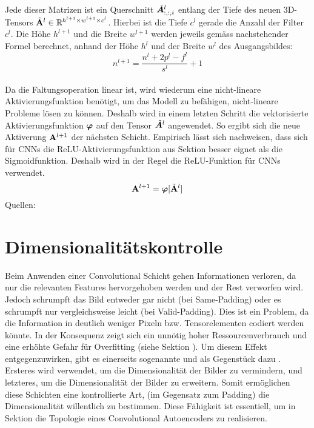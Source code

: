 \\
Jede dieser Matrizen ist ein Querschnitt $\tilde{\bm{A}}^l_{:,:,i}$ entlang der
Tiefe des neuen 3D-Tensors $\tilde{\mathbf{A}}^l \in \mathbb{R}^{h^{l+1} \times w^{l+1} \times c^l}$.
Hierbei ist die Tiefe $c^l$ gerade die Anzahl der Filter $c^l$. Die Höhe
$h^{l+1}$ und die Breite $w^{l+1}$ werden jeweils gemäss nachstehender Formel berechnet,
anhand der Höhe $h^l$ und der Breite $w^l$ des Ausgangsbildes:
\\
\begin{equation}
  n^{l+1} = \frac{n^l + 2p^l - f^l}{s^l} + 1
\end{equation}
\\
Da die Faltungsoperation linear ist, wird wiederum eine
nicht-lineare Aktivierungsfunktion benötigt, um das Modell zu befähigen, nicht-lineare Probleme
lösen zu können.
Deshalb wird in einem letzten Schritt die vektorisierte Aktivierungsfunktion
$\bm{\varphi}$ auf den Tensor $\tilde{\bm{A}}^l$ angewendet. So ergibt sich die
neue Aktiverung $\mathbf{A}^{l+1}$ der nächsten Schicht. Empirisch lässt sich nachweisen,
dass sich für CNNs die ReLU-Aktivierungsfunktion aus Sektion  besser eignet als die
Sigmoidfunktion. Deshalb wird in der Regel die ReLU-Funktion für CNNs verwendet.
\begin{equation}
  \mathbf{A}^{l+1} = \bm{\varphi}[\tilde{\mathbf{A}}^l]
\end{equation}
\para{}
Quellen: \cite{wiki:cnn} \cite{deeplearning.ai:cnn} \cite{Goodfellow-et-al-2016} \cite{Nielsen}

\section{Dimensionalitätskontrolle}\label{sec:dimensionalitätskontrolle}
Beim Anwenden einer Convolutional Schicht gehen Informationen verloren, da nur
die relevanten Features hervorgehoben werden und der Rest verworfen wird. Jedoch
schrumpft das Bild entweder gar nicht (bei Same-Padding) oder es schrumpft nur
vergleichsweise leicht (bei Valid-Padding). Dies ist ein Problem, da die Information in
deutlich weniger Pixeln bzw. Tensorelementen codiert werden könnte. In der Konsequenz
zeigt sich ein unnötig hoher Ressourcenverbrauch und eine erhöhte Gefahr für
Overfitting (siehe Sektion ). Um diesem Effekt
entgegenzuwirken, gibt es einerseits sogenannte
 und als Gegenstück dazu
. Ersteres wird verwendet, um die Dimensionalität
der Bilder zu vermindern, und letzteres, um die Dimensionalität der Bilder zu
erweitern. Somit ermöglichen diese Schichten eine kontrollierte Art, (im Gegensatz zum
Padding) die Dimensionalität willentlich zu bestimmen. Diese Fähigkeit ist
essentiell, um in Sektion  die Topologie
eines Convolutional Autoencoders zu realisieren.

